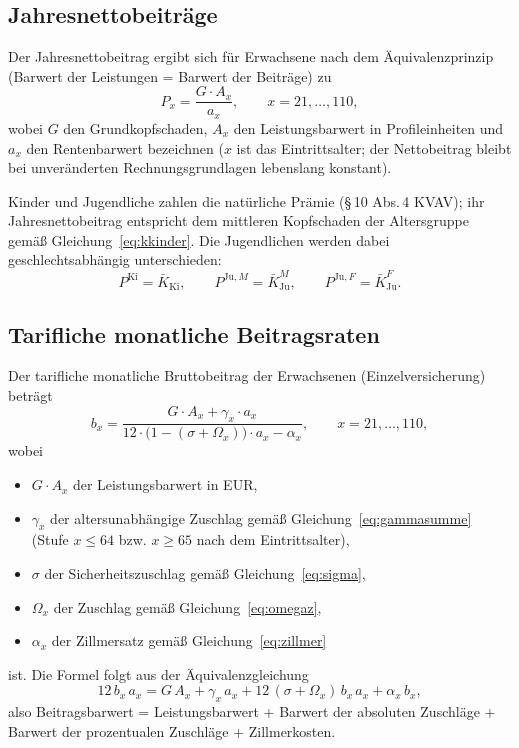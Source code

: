 \subsection{Jahresnettobeiträge}\label{sec:nettobeitraege}

Der Jahresnettobeitrag ergibt sich für Erwachsene nach dem
Äquivalenzprinzip (Barwert der Leistungen = Barwert der Beiträge) zu
\begin{equation}
P_x = \frac{G\cdot A_x}{a_x},
\qquad x = 21,\dots,110,
\label{eq:netto}
\end{equation}
wobei $G$ den Grundkopfschaden, $A_x$ den Leistungsbarwert in
Profileinheiten und $a_x$ den Rentenbarwert bezeichnen ($x$ ist das
Eintrittsalter; der Nettobeitrag bleibt bei unveränderten
Rechnungsgrundlagen lebenslang konstant).

Kinder und Jugendliche zahlen die natürliche Prämie (\S\,10 Abs.\,4
KVAV); ihr Jahresnettobeitrag entspricht dem mittleren Kopfschaden der
Altersgruppe gemäß Gleichung~\eqref{eq:kkinder}. Die Jugendlichen werden
dabei geschlechtsabhängig unterschieden:
\begin{equation}
P^{\mathrm{Ki}} = \bar{K}_{\mathrm{Ki}},
\qquad
P^{\mathrm{Ju},M} = \bar{K}^{M}_{\mathrm{Ju}},
\qquad
P^{\mathrm{Ju},F} = \bar{K}^{F}_{\mathrm{Ju}}.
\label{eq:pkinder}
\end{equation}

\subsection{Tarifliche monatliche Beitragsraten}\label{sec:beitragsraten}

Der tarifliche monatliche Bruttobeitrag der Erwachsenen
(Einzelversicherung) beträgt
\begin{equation}
b_x = \frac{G\cdot A_x + \gamma_x\cdot a_x}
           {12\cdot\bigl(1-(\sigma+\Omega_x)\bigr)\cdot a_x - \alpha_x},
\qquad x = 21,\dots,110,
\label{eq:brutto}
\end{equation}
wobei
\begin{itemize}\itemsep1pt
  \item $G\cdot A_x$ der Leistungsbarwert in EUR,
  \item $\gamma_x$ der altersunabhängige Zuschlag gemäß
        Gleichung~\eqref{eq:gammasumme} (Stufe $x \le 64$ bzw.
        $x \ge 65$ nach dem Eintrittsalter),
  \item $\sigma$ der Sicherheitszuschlag gemäß
        Gleichung~\eqref{eq:sigma},
  \item $\Omega_x$ der Zuschlag gemäß Gleichung~\eqref{eq:omegaz},
  \item $\alpha_x$ der Zillmersatz gemäß Gleichung~\eqref{eq:zillmer}
\end{itemize}
ist. Die Formel folgt aus der Äquivalenzgleichung
\begin{equation}
12\,b_x\,a_x = G\,A_x + \gamma_x\,a_x
+ 12\,(\sigma+\Omega_x)\,b_x\,a_x + \alpha_x\,b_x,
\label{eq:aequivalenz}
\end{equation}
also Beitragsbarwert = Leistungsbarwert + Barwert der absoluten Zuschläge
+ Barwert der prozentualen Zuschläge + Zillmerkosten.

